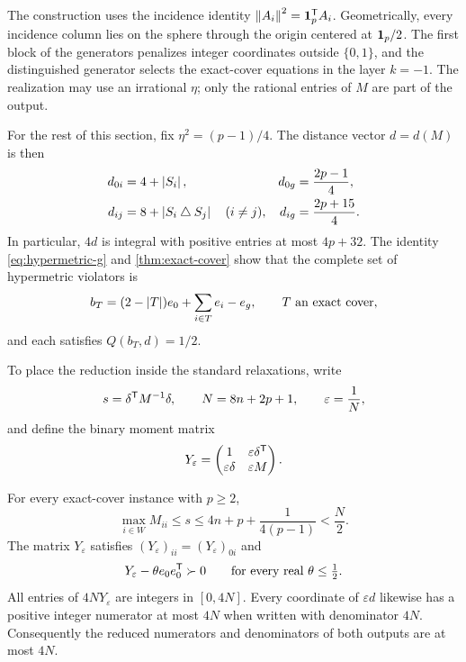 The construction uses the incidence identity
$\left\lVert A_i\right\rVert^2=\mathbf 1_p^{\mathsf T} A_i$.  Geometrically, every incidence column
lies on the sphere through the origin centered at $\mathbf 1_p/2$.
The first block of the generators penalizes integer coordinates outside
$\{0,1\}$, and the distinguished generator selects the exact-cover
equations in the layer $k=-1$.  The realization may use an irrational
$\eta$; only the rational entries of $M$ are part of the output.

For the rest of this section, fix
$\eta^2=(p-1)/4$.  The distance vector $d=d(M)$ is then
\begin{equation}\label{eq:cover-distances}
\begin{aligned}
  d_{0i}&=4+\left\lvert S_i\right\rvert, &
  d_{0g}&=\frac{2p-1}{4},\\
  d_{ij}&=8+\left\lvert S_i\mathbin{\triangle} S_j\right\rvert\quad(i\ne j), &
  d_{ig}&=\frac{2p+15}{4}.
\end{aligned}
\end{equation}
In particular, $4d$ is integral with positive entries at most $4p+32$.
The identity \eqref{eq:hypermetric-g} and \cref{thm:exact-cover} show that
the complete set of hypermetric violators is
\begin{equation}\label{eq:cover-hypermetric-vectors}
  b_T=(2-\left\lvert T\right\rvert)e_0+\sum_{i\in T}e_i-e_g,
  \qquad T\text{ an exact cover},
\end{equation}
and each satisfies $Q(b_T,d)=1/2$.

To place the reduction inside the standard relaxations, write
\begin{equation}\label{eq:core-scaling}
  s=\delta^{\mathsf T} M^{-1}\delta,\qquad
  N=8n+2p+1,\qquad \varepsilon=\frac1N,
\end{equation}
and define the binary moment matrix
\begin{equation}\label{eq:core-moment}
  Y_\varepsilon=
  \begin{pmatrix}
    1&\varepsilon\delta^{\mathsf T}\\
    \varepsilon\delta&\varepsilon M
  \end{pmatrix}.
\end{equation}

\begin{lemma}\label{lem:scaling}
For every exact-cover instance with $p\geq2$,
\begin{equation}\label{eq:scaling-bound}
  \max_{i\in W}M_{ii}
  \leq s\leq4n+p+\frac1{4(p-1)}<\frac N2.
\end{equation}
The matrix $Y_\varepsilon$ satisfies
$(Y_\varepsilon)_{ii}=(Y_\varepsilon)_{0i}$ and
\begin{equation}\label{eq:core-definiteness-margin}
  Y_\varepsilon-\theta e_0e_0^{\mathsf T}\succ0
  \qquad\text{for every real }\theta\leq\tfrac12.
\end{equation}
All entries of $4N Y_\varepsilon$ are integers in $[0,4N]$.
Every coordinate of $\varepsilon d$ likewise has a positive integer
numerator at most $4N$ when written with denominator $4N$.
Consequently the reduced numerators and denominators of both outputs are
at most $4N$.
\end{lemma}

